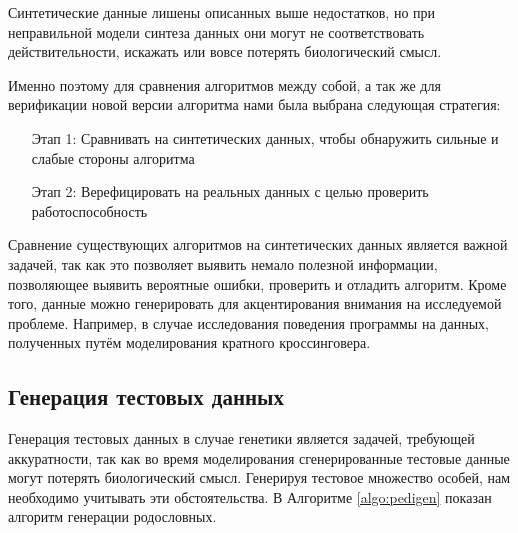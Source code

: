 \documentclass{matmex-diploma-custom}
\begin{document}
Синтетические данные лишены описанных выше недостатков, но при
неправильной модели синтеза данных они могут не соответствовать
действительности, искажать или вовсе потерять биологический смысл.

Именно поэтому для сравнения алгоритмов между собой, а так же для
верификации новой версии алгоритма нами была выбрана следующая
стратегия:

\begin{enumerate}
\item[Этап 1:] Сравнивать на синтетических данных, чтобы обнаружить
  сильные и слабые стороны алгоритма
\item[Этап 2:] Верефицировать на реальных данных с целью проверить
  работоспособность
\end{enumerate}

Сравнение существующих алгоритмов на синтетических данных является
важной задачей, так как это позволяет выявить немало полезной
информации, позволяющее выявить вероятные ошибки, проверить и отладить
алгоритм. Кроме того, данные можно генерировать для акцентирования
внимания на исследуемой проблеме. Например, в случае исследования
поведения программы на данных, полученных путём моделирования кратного
кроссинговера.

\subsection{Генерация тестовых данных}

Генерация тестовых данных в случае генетики является задачей,
требующей аккуратности, так как во время моделирования сгенерированные
тестовые данные могут потерять биологический смысл. Генерируя тестовое
множество особей, нам необходимо учитывать эти обстоятельства. В
Алгоритме \ref{algo:pedigen} показан алгоритм генерации родословных.
\end{document}
